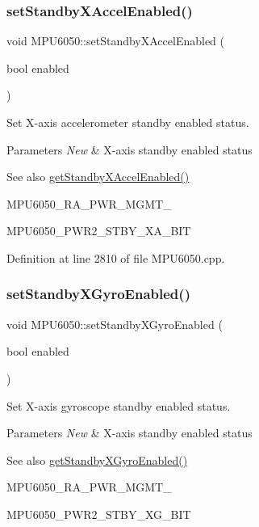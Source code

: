 \subsubsection{\texorpdfstring{setStandbyXAccelEnabled()}{setStandbyXAccelEnabled()}}
{\footnotesize\ttfamily void M\+P\+U6050\+::set\+Standby\+X\+Accel\+Enabled (\begin{DoxyParamCaption}\item[{bool}]{enabled }\end{DoxyParamCaption})}



Set X-\/axis accelerometer standby enabled status. 


\begin{DoxyParams}{Parameters}
{\em New} & X-\/axis standby enabled status \\
\hline
\end{DoxyParams}
\begin{DoxySeeAlso}{See also}
\mbox{\hyperlink{classMPU6050_a99261a04739fdb7a9a1c5b67ce3e710e}{get\+Standby\+X\+Accel\+Enabled()}} 

M\+P\+U6050\+\_\+\+R\+A\+\_\+\+P\+W\+R\+\_\+\+M\+G\+M\+T\+\_ 

M\+P\+U6050\+\_\+\+P\+W\+R2\+\_\+\+S\+T\+B\+Y\+\_\+\+X\+A\+\_\+\+B\+IT 
\end{DoxySeeAlso}


Definition at line 2810 of file M\+P\+U6050.\+cpp.

\mbox{\label{classMPU6050_ac1c6d8f623a9ca00a4ddc50f6615b977}} 
\subsubsection{\texorpdfstring{setStandbyXGyroEnabled()}{setStandbyXGyroEnabled()}}
{\footnotesize\ttfamily void M\+P\+U6050\+::set\+Standby\+X\+Gyro\+Enabled (\begin{DoxyParamCaption}\item[{bool}]{enabled }\end{DoxyParamCaption})}



Set X-\/axis gyroscope standby enabled status. 


\begin{DoxyParams}{Parameters}
{\em New} & X-\/axis standby enabled status \\
\hline
\end{DoxyParams}
\begin{DoxySeeAlso}{See also}
\mbox{\hyperlink{classMPU6050_acb5fde4167aa54fbbe84706d577a48a6}{get\+Standby\+X\+Gyro\+Enabled()}} 

M\+P\+U6050\+\_\+\+R\+A\+\_\+\+P\+W\+R\+\_\+\+M\+G\+M\+T\+\_ 

M\+P\+U6050\+\_\+\+P\+W\+R2\+\_\+\+S\+T\+B\+Y\+\_\+\+X\+G\+\_\+\+B\+IT 
\end{DoxySeeAlso}


